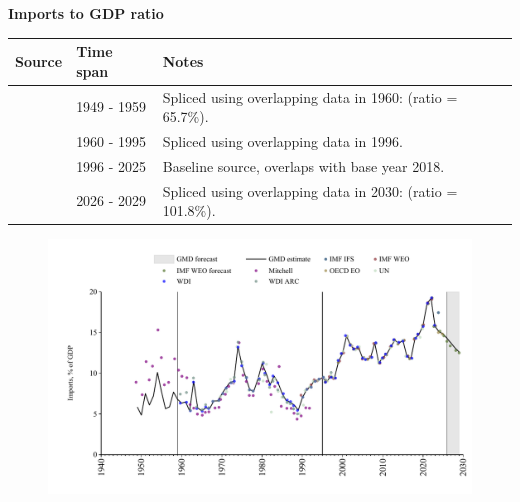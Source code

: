 \documentclass[12pt,a4paper,landscape]{article}
\begin{document}
\begin{adjustbox}{max totalsize={\paperwidth}{\paperheight},center}
\begin{minipage}[t][\textheight][t]{\textwidth}
\vspace*{0.5cm}
{}
\begin{center}
{\Large\bfseries Imports to GDP ratio}
\end{center}
\vspace{0.5cm}
\begin{table}[H]
\centering
\small
\begin{tabular}{|l|l|l|}
\hline
\textbf{Source} & \textbf{Time span} & \textbf{Notes} \\
\hline
\rowcolor{white}\cite{Mitchell}& 1949 - 1959 &Spliced using overlapping data in 1960: (ratio = 65.7\%). \\
\rowcolor{lightgray}\cite{WDI}& 1960 - 1995 &Spliced using overlapping data in 1996. \\
\rowcolor{white}\cite{OECD_EO}& 1996 - 2025 &Baseline source, overlaps with base year 2018. \\
\rowcolor{lightgray}\cite{IMF_WEO_forecast}& 2026 - 2029 &Spliced using overlapping data in 2030: (ratio = 101.8\%). \\
\hline
\end{tabular}
\end{table}
\begin{figure}[H]
\centering
\includegraphics[width=\textwidth,height=0.6\textheight,keepaspectratio]{graphs/BRA_imports_GDP.pdf}
\end{figure}
\end{minipage}
\end{adjustbox}
\end{document}
